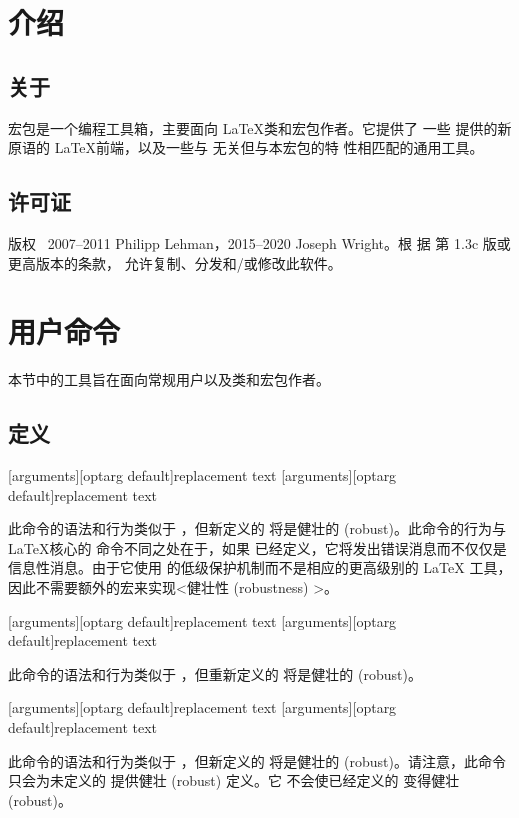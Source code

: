 \documentclass{ltxdockit}[2010/09/26]
\begin{document}
\printtitlepage
\tableofcontents

\section{介绍}
\label{int}

\subsection[关于]{关于 }

 宏包是一个编程工具箱，主要面向 \LaTeX 类和宏包作者。它提供了
一些 \etex 提供的新原语的 \LaTeX 前端，以及一些与 \etex 无关但与本宏包的特
性相匹配的通用工具。

\subsection{许可证}

版权 \textcopyright\ 2007--2011 Philipp Lehman，2015--2020 Joseph Wright。根
据 \lppl {} 第 1.3c 版或更高版本的条款，
允许复制、分发和/或修改此软件。


\section{用户命令}
\label{use}

本节中的工具旨在面向常规用户以及类和宏包作者。

\subsection{定义}
\label{use:def}

\begin{ltxsyntax}

  [arguments][optarg default]{replacement text}
  [arguments][optarg default]{replacement text}

  此命令的语法和行为类似于 ，但新定义的 
  将是健壮的 (robust)。此命令的行为与 \LaTeX 核心的 
  命令不同之处在于，如果  已经定义，它将发出错误消息而不仅仅是
  信息性消息。由于它使用 \etex 的低级保护机制而不是相应的更高级别的 \LaTeX
  工具，因此不需要额外的宏来实现<健壮性 (robustness) >。

  [arguments][optarg default]{replacement text}
  [arguments][optarg default]{replacement text}

  此命令的语法和行为类似于 ，但重新定义的 
  将是健壮的 (robust)。

  [arguments][optarg default]{replacement text}
  [arguments][optarg default]{replacement text}

  此命令的语法和行为类似于 ，但新定义的 
  将是健壮的 (robust)。请注意，此命令只会为未定义的  提供健壮 (robust) 定义。它
  不会使已经定义的  变得健壮 (robust)。
\end{ltxsyntax}
\end{document}
